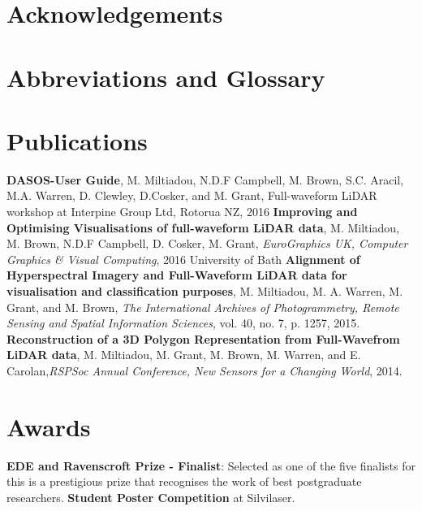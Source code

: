 \documentclass[11pt,nofootinbib]{report}
\begin{document}
\newpage
\thispagestyle{empty}
	\setcounter{secnumdepth}{0}

%		
	\section{Acknowledgements}\label{Acknowledgments}
		
		\thispagestyle{empty}
		\newpage
	

	\section {Abbreviations and Glossary}\label{Abbreviations}
	
	\newpage
	\section{Publications}
		\textbf{DASOS-User Guide}, M. Miltiadou, N.D.F Campbell, M. Brown, S.C. Aracil, M.A. Warren, D. Clewley, D.Cosker, and M. Grant, Full-waveform LiDAR workshop at Interpine Group Ltd, Rotorua NZ, 2016\newline
		\textbf{Improving and Optimising Visualisations of full-waveform LiDAR data}, M. Miltiadou, M. Brown, N.D.F Campbell,  D. Cosker, M. Grant, \textit{EuroGraphics UK, Computer Graphics \& Visual Computing}, 2016 \newline
		University of Bath
		\textbf{Alignment of Hyperspectral Imagery and Full-Waveform LiDAR data for visualisation and classification purposes}, M. Miltiadou, M. A. Warren, M. Grant, and M. Brown, \textit{The International Archives of Photogrammetry, Remote Sensing and Spatial Information Sciences}, vol. 40, no. 7, p. 1257, 2015.\newline
		\textbf{Reconstruction of a 3D Polygon Representation from Full-Wavefrom LiDAR data}, M. Miltiadou, M. Grant, M. Brown, M. Warren, and E. Carolan,\textit{RSPSoc Annual Conference, New Sensors for a Changing World}, 2014.\newline
	 
	
	\section{Awards}
		\textbf{EDE and Ravenscroft Prize - Finalist}: Selected as one of the five finalists for this is a prestigious prize that recognises the work of best postgraduate researchers.\newline
		\textbf{Student Poster Competition} at Silvilaser.
		
\end{document}
